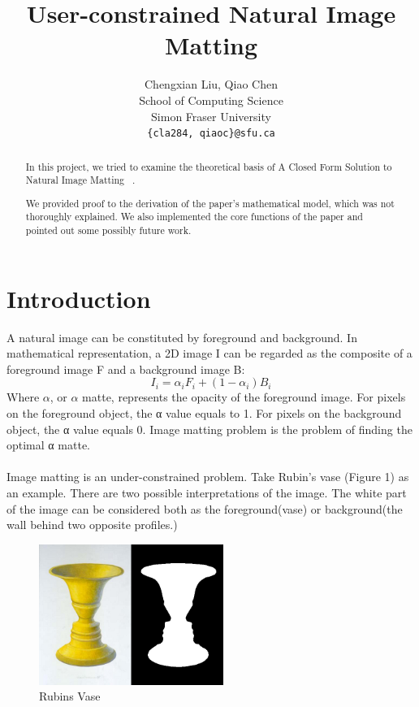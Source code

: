 \documentclass[11pt,letterpaper]{article}
\title{User-constrained Natural Image Matting}
\author{Chengxian Liu, Qiao Chen\\
  School of Computing Science \\ Simon Fraser University \\
  {\tt \{cla284, qiaoc\}@sfu.ca}  
}
\begin{document}
\maketitle
\begin{abstract}
In this project, we tried to examine the theoretical basis of A Closed Form Solution to Natural Image Matting ~\cite{Levin:2006}.

We provided proof to the derivation of the paper’s mathematical model, which was not thoroughly explained. We also implemented the core functions of the paper and pointed out some possibly future work.
\end{abstract}

\section{Introduction}
A natural image can be constituted by foreground and background. In mathematical representation, a 2D image I can be regarded as the composite of a foreground image F and a background image B:
$$I_{i} = \alpha_{i}F_{i} + (1-\alpha_{i})B_{i}$$
Where $\alpha$, or $\alpha$ matte, represents the opacity of the foreground image. For pixels on the foreground object, the α value equals to 1. For pixels on the background object, the α value equals 0. Image matting problem is the problem of finding the optimal α matte.\\\\
Image matting is an under-constrained problem. Take Rubin’s vase (Figure 1) as an example. There are two possible interpretations of the image. The white part of the image can be considered both as the foreground(vase) or background(the wall behind two opposite profiles.)

\begin{figure}[h]
  \begin{center}
    \includegraphics[width=6cm]{rubins_vase.jpg} 
    \caption{Rubins Vase}
  \end{center}
\end{figure}
\end{document}
